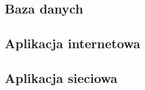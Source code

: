 
\subsection{Baza danych}




\subsection{Aplikacja internetowa}




\subsection{Aplikacja sieciowa}
